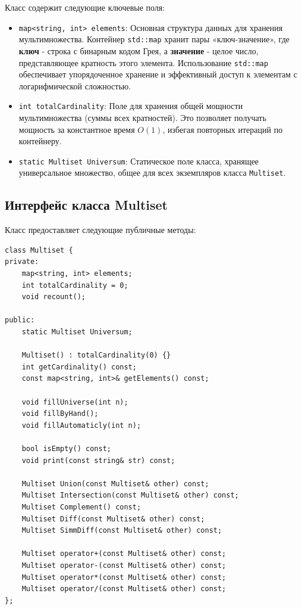 Класс содержит следующие ключевые поля:
\begin{itemize}
    \item \texttt{map<string, int> elements}: Основная структура данных для хранения мультимножества. Контейнер \texttt{std::map} хранит пары «ключ-значение», где \textbf{ключ} - строка с бинарным кодом Грея, а \textbf{значение} - целое число, представляющее кратность этого элемента. Использование \texttt{std::map} обеспечивает упорядоченное хранение и эффективный доступ к элементам с логарифмической сложностью.
    
    \item \texttt{int totalCardinality}: Поле для хранения общей мощности мультимножества (суммы всех кратностей). Это позволяет получать мощность за константное время $O(1)$, избегая повторных итераций по контейнеру.
    
    \item \texttt{static Multiset Universum}: Статическое поле класса, хранящее универсальное множество, общее для всех экземпляров класса \texttt{Multiset}.
\end{itemize}

\subsection{Интерфейс класса Multiset}

Класс предоставляет следующие публичные методы:

\begin{lstlisting}[style=cstyle, caption={Объявление класса Multiset}]
class Multiset {
private:
    map<string, int> elements;
    int totalCardinality = 0;
    void recount();

public:
    static Multiset Universum;

    Multiset() : totalCardinality(0) {}
    int getCardinality() const;
    const map<string, int>& getElements() const;

    void fillUniverse(int n);
    void fillByHand();
    void fillAutomaticly(int n);

    bool isEmpty() const;
    void print(const string& str) const;

    Multiset Union(const Multiset& other) const;
    Multiset Intersection(const Multiset& other) const;
    Multiset Complement() const;
    Multiset Diff(const Multiset& other) const;
    Multiset SimmDiff(const Multiset& other) const;

    Multiset operator+(const Multiset& other) const;
    Multiset operator-(const Multiset& other) const;
    Multiset operator*(const Multiset& other) const;
    Multiset operator/(const Multiset& other) const;
};
\end{lstlisting}

